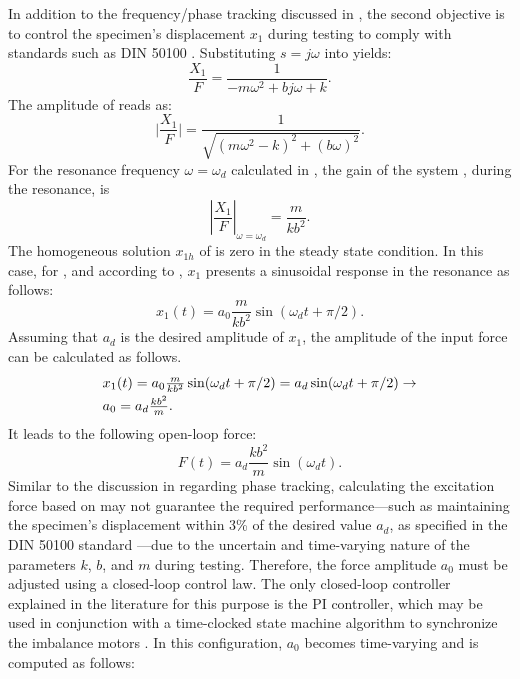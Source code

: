 \documentclass[lettersize,journal]{IEEEtran}
\begin{document}
In addition to the frequency/phase tracking discussed in , the second objective is to control the specimen's displacement $x_1$ during testing to comply with standards such as DIN 50100 \cite{DIN_standard}. Substituting $s = j\omega$ into  yields:
\begin{equation}
\frac{X_1}{F}=\frac{1}{-m\omega^2+bj\omega+k} .
\label{E_Laplace_frequency}
\end{equation}
The amplitude of  reads as:
\begin{equation}
\big|\frac{X_1}{F}\big|=\frac{1}{\sqrt{(m\omega^2-k)^2+(b\omega)^2}}.
\label{E_Laplace_frequency_mag}
\end{equation}
For the resonance frequency $\omega=\omega_d$ calculated in , the gain of the system , during the resonance, is
\begin{equation}
|\frac{X_1}{F}|_{\omega=\omega_d}=\frac{m}{kb^2}.
\label{E_Laplace_frequency_mag_resonance}
\end{equation}
The homogeneous solution $x_{1h}$ of  is zero in the steady state condition. In this case, for , and according to , $x_1$ presents a sinusoidal response in the resonance as follows:
\begin{equation}
x_1(t)=a_0 \frac{m}{kb^2} \sin(\omega_d t+\pi/2).
\label{E_x_1_steady_amplitude}
\end{equation}
Assuming that $a_d$ is the desired amplitude of $x_1$, the amplitude of the input force can be calculated as follows.
\begin{equation}
\begin{array}{l}
x_1(t)=a_0 \frac{m}{kb^2} \sin(\omega_d t+\pi/2) = a_d  \sin(\omega_d t+\pi/2) \rightarrow \vspace{0.1cm} \\ 
a_0=a_d \frac{kb^2}{m}. 
\end{array}
\label{E_x_1_steady_a0}
\end{equation}
It leads to the following open-loop force:
\begin{equation}
F(t)=a_d \frac{kb^2}{m} \sin(\omega_dt). 
\label{E_x_1_open_loop_force}
\end{equation}
Similar to the discussion in  regarding phase tracking, calculating the excitation force based on  may not guarantee the required performance—such as maintaining the specimen's displacement within 3\% of the desired value $a_d$, as specified in the DIN 50100 standard \cite{DIN_standard}—due to the uncertain and time-varying nature of the parameters $k$, $b$, and $m$ during testing. Therefore, the force amplitude $a_0$ must be adjusted using a closed-loop control law. The only closed-loop controller explained in the literature for this purpose is the PI controller, which may be used in conjunction with a time-clocked state machine algorithm to synchronize the imbalance motors \cite{SCHRAMM2024117045,SCHNEIDER2018171,herrmann2018simulation_Thesis}. In this configuration, $a_0$ becomes time-varying and is computed as follows:
\end{document}
